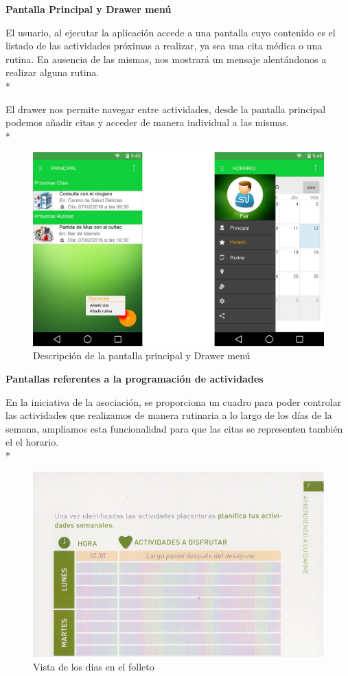 \documentclass[../pfc.tex]{subfiles}
\begin{document}
		
		
		\textbf{Pantalla Principal y Drawer menú}
		
		El usuario, al ejecutar la aplicación accede a una pantalla cuyo contenido es el listado de las actividades próximas a realizar, ya sea una cita médica o una rutina. En ausencia de las mismas, nos mostrará un mensaje alentándonos a realizar alguna rutina.\\*
		
		El drawer nos permite navegar entre actividades, desde la pantalla principal podemos añadir citas y acceder de manera individual a las mismas.\\*
	 
		
		\begin{figure}[H]
			\centering
			\includegraphics[width=0.8\linewidth]{../images/principal_2}
			\caption[Drawer menú y Pantalla principal]{Descripción de la pantalla principal y Drawer menú}
			\label{fig:principal}
		\end{figure}
		
		
		\textbf{Pantallas referentes a la programación de actividades}
		
		En la iniciativa de la asociación, se proporciona un cuadro para poder controlar las actividades que realizamos de manera rutinaria a lo largo de los días de la semana, ampliamos esta funcionalidad para que las citas se representen también el el horario.\\*
		
			\begin{figure}[H]
				\centering
				\includegraphics[width=0.7\linewidth]{../folleto/007_corto}
				\caption{Vista de los días en el folleto}
				\label{fig:horario_corto}
			\end{figure}
		
\end{document}
